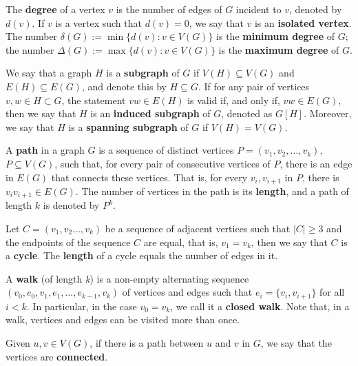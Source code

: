 The \textbf{degree} of a vertex \(v\) is the number of edges of \(G\) incident to \(v\), denoted by \(d(v)\). If \(v\) is a vertex such that \(d(v) = 0\), we say that \(v\) is an \textbf{isolated vertex}. The number \(\delta(G) := \min \{d(v) \colon v \in V(G)\}\) is the \textbf{minimum degree} of \(G\); the number \(\Delta(G) := \max \{d(v) \colon v \in V(G)\}\) is the \textbf{maximum degree} of \(G\).

We say that a graph \(H\) is a \textbf{subgraph} of \(G\) if \(V(H) \subseteq V(G)\) and \(E(H) \subseteq E(G)\), and denote this by \(H \subseteq G\). If for any pair of vertices \(v, w \in H \subset G\), the statement \(vw \in E(H)\) is valid if, and only if, \(vw \in E(G)\), then we say that \(H\) is an \textbf{induced subgraph} of \(G\), denoted as \(G[H]\). Moreover, we say that \(H\) is a \textbf{spanning subgraph} of \(G\) if \(V(H) = V(G)\).

A \textbf{path} in a graph \(G\) is a sequence of distinct vertices \(P = (v_1, v_2, \dots, v_k)\), \(P \subseteq V(G)\), such that, for every pair of consecutive vertices of \(P\), there is an edge in \(E(G)\) that connects these vertices. That is, for every \(v_i , v_{i+1}\) in \(P\), there is \(v_i v _{i+1} \in E(G)\). The number of vertices in the path is its \textbf{length}, and a path of length \(k\) is denoted by \(P^k\).

Let \(C = (v_1, v_2 \dots, v_k)\) be a sequence of adjacent vertices such that \(|C| \geq 3\) and the endpoints of the sequence \(C\) are equal, that is, \(v_1 = v_k\), then we say that \(C\) is a \textbf{cycle}. The \textbf{length} of a cycle equals the number of edges in it. 

A \textbf{walk} (of length \textit{k}) is a non-empty alternating sequence \((v_0, e_0, v_1, e_1, \dots, e_{k-1}, v_k)\) of vertices and edges such that \(e_i = \{v_i, v_{i+1}\}\) for all \(i < k\). In particular, in the case \(v_0 = v_k\), we call it a \textbf{closed walk}. Note that, in a walk, vertices and edges can be visited more than once.


Given \(u, v \in V(G)\), if there is a path between \(u\) and \(v\) in \(G\), we say that the vertices are \textbf{connected}.

